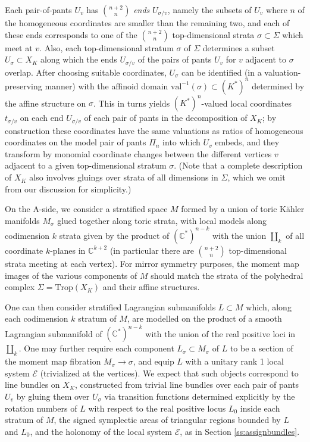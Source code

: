 \documentclass[11pt,leqno]{amsart}
\numberwithin{equation}{section}
\def\C{\mathbb{C}}
\def\val{\mathrm{val}}
\newcommand{\cE}{{\mathcal E}}
\begin{document}
Each pair-of-pants $U_v$ has
$\binom{n+2}{n}$ {\em ends} $U_{\sigma/v}$, namely the subsets of $U_v$ 
where $n$ of the homogeneous coordinates
are smaller than the remaining two, and each of these ends corresponds
to one of the $\binom{n+2}{n}$ top-dimensional strata $\sigma\subset \Sigma$ which meet 
at $v$. Also, each top-dimensional stratum $\sigma$ of $\Sigma$ determines a subset
$U_\sigma\subset X_K$ along which the ends $U_{\sigma/v}$
of the pairs of pants $U_v$ for $v$ adjacent to $\sigma$ 
overlap. After choosing suitable
coordinates, $U_\sigma$ can be identified (in a valuation-preserving manner)
with the affinoid domain $\val^{-1}(\sigma)\subset (K^*)^n$ determined by the
affine structure on $\sigma$. This in turns yields $(K^*)^n$-valued
local coordinates $t_{\sigma/v}$ on each end $U_{\sigma/v}$ of each
pair of pants in the decomposition of $X_K$; by construction these coordinates
have the same valuations as ratios of homogeneous coordinates on the model
pair of pants $\Pi_n$ into which $U_v$ embeds, and they transform by monomial coordinate changes between the
different vertices $v$ adjacent to a given top-dimensional stratum $\sigma$.
(Note that a complete description of $X_K$ also involves gluings over strata of
all dimensions in $\Sigma$, which we omit from our discussion for
simplicity.)

On the A-side, we consider a stratified space $M$ formed by a union of 
toric K\"ahler manifolds $M_\sigma$ glued together along toric strata, with
local models along codimension $k$ strata given by
the product of $(\C^*)^{n-k}$ with the union $\amalg_k$ of all coordinate $k$-planes in
$\C^{k+2}$ (in particular there are $\binom{n+2}{n}$
top-dimensional strata meeting at each vertex).
For mirror symmetry purposes, the moment map images of the various
components of $M$ should match the strata of the polyhedral complex
$\Sigma=\mathrm{Trop}(X_K)$ and their affine structures.

One can then consider stratified Lagrangian submanifolds $L\subset M$
which, along each codimension $k$ stratum of $M$, are modelled on the product
of a smooth Lagrangian submanifold of $(\C^*)^{n-k}$ with the union of
the real positive loci in $\amalg_k$.  One may further require each
component $L_\sigma\subset M_\sigma$ of $L$ to be a section of the
moment map fibration $M_\sigma\to \sigma$, and equip $L$ with a unitary
rank 1 local system $\mathcal{E}$ (trivialized at the vertices). 
We expect that such
objects correspond to line bundles on $X_K$, constructed from 
trivial line bundles over each pair of pants $U_v$ by gluing them over
$U_\sigma$ via transition functions determined explicitly by the rotation 
numbers of $L$ with respect to the real positive locus $L_0$ inside each
stratum of $M$, the signed symplectic areas of triangular regions
bounded by $L$ and $L_0$, and the holonomy of the local system $\cE$,
as in Section \ref{ss:assignbundles}.
\end{document}
